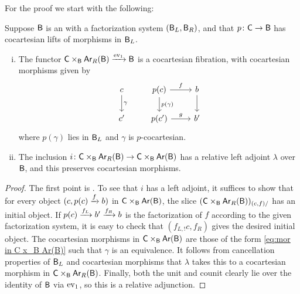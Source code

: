 \documentclass[a4paper,11pt]{article}
\begin{document}
For the proof we start with the following:
\begin{lemma}\label{lem:factLcocfreeadj}
  Suppose $\textup{\textsf{B}}$ is an \icat{} with a factorization system
  $(\textup{\textsf{B}}_{L},\textup{\textsf{B}}_{R})$, and that $p \colon \oC \to \oB$ has cocartesian lifts
  of morphisms in $\textup{\textsf{B}}_{L}$.
  \begin{enumerate}[(i)]
  \item The functor $\oC \times_{\oB} \Ar_{R}(\oB)
  \xto{\ev_{1}} \oB$ is a cocartesian fibration, with cocartesian
  morphisms given by
  \begin{equation}
    \label{eq:mor in C x_B Ar(B)}
    \begin{tikzcd}
      c \ar[d, "\gamma"] & p(c) \ar[r, "f"] \ar[d, "p(\gamma)"] & b \ar[d] \\
      c' & p(c') \ar[r, "g"] & b'
    \end{tikzcd}
  \end{equation}
  where $p(\gamma)$ lies in $\textup{\textsf{B}}_{L}$ and $\gamma$ is
  $p$-cocartesian.
\item The inclusion
  $i \colon \oC \times_{\oB} \Ar_{R}(\oB) \to \oC \times_{\oB}
  \Ar(\oB)$ has a relative left adjoint $\lambda$ over $\textup{\textsf{B}}$, and this
  preserves cocartesian morphisms.
  \end{enumerate}
\end{lemma}
\begin{proof}
  The first point is \cite[Proposition 2.2.2]{envelopes}. To see that $i$ has a
  left adjoint, it suffices to show that for every object
  $(c, p(c) \xto{f} b)$ in $\textup{\textsf{C}} \times_{\textup{\textsf{B}}} \textup{\textsf{Ar}}(\textup{\textsf{B}})$, the slice
  $(\textup{\textsf{C}} \times_{\textup{\textsf{B}}} \textup{\textsf{Ar}}_{R}(\textup{\textsf{B}}))_{(c,f)/}$ has an initial object. If
  $p(c) \xto{f_{L}} b' \xto{f_{R}} b$ is the factorization of $f$
  according to the given factorization system, it is easy to check
  that $(f_{L,!}c, f_{R})$ gives the desired initial object.
  The cocartesian morphisms in $\textup{\textsf{C}} \times_{\textup{\textsf{B}}} \textup{\textsf{Ar}}(\textup{\textsf{B}})$ are those
  of the form \cref{eq:mor in C x_B Ar(B)} such that $\gamma$ is an
  equivalence. It follows from cancellation properties of $\textup{\textsf{B}}_{L}$
  and cocartesian morphisms that $\lambda$ takes this to a cocartesian
  morphism  in $\textup{\textsf{C}} \times_{\textup{\textsf{B}}} \textup{\textsf{Ar}}_{R}(\textup{\textsf{B}})$.  Finally,
  both the unit and counit clearly lie over the identity of $\textup{\textsf{B}}$ via
  $\text{\textup{ev}}_{1}$, so this is a relative adjunction.
\end{proof}
\end{document}
